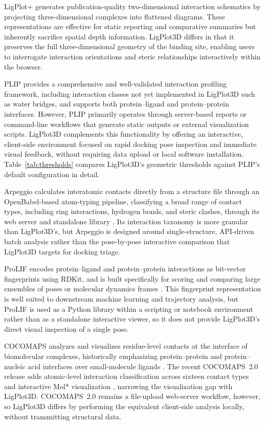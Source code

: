 \documentclass[lettersize,journal]{IEEEtran}
\begin{document}
LigPlot+ generates publication-quality two-dimensional interaction schematics by projecting three-dimensional complexes into flattened diagrams. These representations are effective for static reporting and comparative summaries but inherently sacrifice spatial depth information. LigPlot3D differs in that it preserves the full three-dimensional geometry of the binding site, enabling users to interrogate interaction orientations and steric relationships interactively within the browser.

PLIP provides a comprehensive and well-validated interaction profiling framework, including interaction classes not yet implemented in LigPlot3D such as water bridges, and supports both protein--ligand and protein--protein interfaces. However, PLIP primarily operates through server-based reports or command-line workflows that generate static outputs or external visualization scripts. LigPlot3D complements this functionality by offering an interactive, client-side environment focused on rapid docking pose inspection and immediate visual feedback, without requiring data upload or local software installation. Table~\ref{tab:thresholds} compares LigPlot3D's geometric thresholds against PLIP's default configuration in detail.

Arpeggio calculates interatomic contacts directly from a structure file through an OpenBabel-based atom-typing pipeline, classifying a broad range of contact types, including ring interactions, hydrogen bonds, and steric clashes, through its web server and standalone library \cite{jubb2017arpeggio}. Its interaction taxonomy is more granular than LigPlot3D's, but Arpeggio is designed around single-structure, API-driven batch analysis rather than the pose-by-pose interactive comparison that LigPlot3D targets for docking triage.

ProLIF encodes protein--ligand and protein--protein interactions as bit-vector fingerprints using RDKit, and is built specifically for scoring and comparing large ensembles of poses or molecular dynamics frames \cite{bouysset2021prolif}. This fingerprint representation is well suited to downstream machine learning and trajectory analysis, but ProLIF is used as a Python library within a scripting or notebook environment rather than as a standalone interactive viewer, so it does not provide LigPlot3D's direct visual inspection of a single pose.

COCOMAPS analyzes and visualizes residue-level contacts at the interface of biomolecular complexes, historically emphasizing protein--protein and protein--nucleic acid interfaces over small-molecule ligands \cite{vangone2011cocomaps}. The recent COCOMAPS~2.0 release adds atomic-level interaction classification across sixteen contact types and interactive Mol* visualization \cite{chawla2025cocomaps2}, narrowing the visualization gap with LigPlot3D. COCOMAPS~2.0 remains a file-upload web-server workflow, however, so LigPlot3D differs by performing the equivalent client-side analysis locally, without transmitting structural data.
\end{document}
